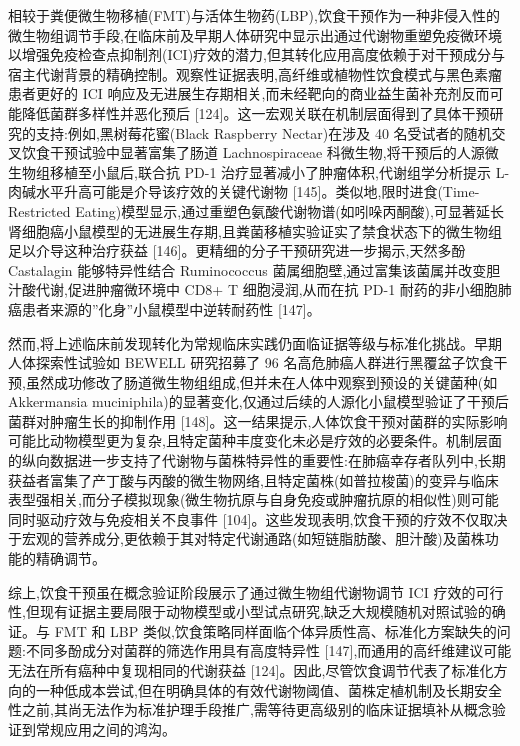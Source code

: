 \documentclass[11pt]{article}
\begin{document}
相较于粪便微生物移植(FMT)与活体生物药(LBP),饮食干预作为一种非侵入性的微生物组调节手段,在临床前及早期人体研究中显示出通过代谢物重塑免疫微环境以增强免疫检查点抑制剂(ICI)疗效的潜力,但其转化应用高度依赖于对干预成分与宿主代谢背景的精确控制。观察性证据表明,高纤维或植物性饮食模式与黑色素瘤患者更好的 ICI 响应及无进展生存期相关,而未经靶向的商业益生菌补充剂反而可能降低菌群多样性并恶化预后 {[}124{]}。这一宏观关联在机制层面得到了具体干预研究的支持:例如,黑树莓花蜜(Black Raspberry Nectar)在涉及 40 名受试者的随机交叉饮食干预试验中显著富集了肠道 Lachnospiraceae 科微生物,将干预后的人源微生物组移植至小鼠后,联合抗 PD-1 治疗显著减小了肿瘤体积,代谢组学分析提示 L-肉碱水平升高可能是介导该疗效的关键代谢物 {[}145{]}。类似地,限时进食(Time-Restricted Eating)模型显示,通过重塑色氨酸代谢物谱(如吲哚丙酮酸),可显著延长肾细胞癌小鼠模型的无进展生存期,且粪菌移植实验证实了禁食状态下的微生物组足以介导这种治疗获益 {[}146{]}。更精细的分子干预研究进一步揭示,天然多酚 Castalagin 能够特异性结合 Ruminococcus 菌属细胞壁,通过富集该菌属并改变胆汁酸代谢,促进肿瘤微环境中 CD8+ T 细胞浸润,从而在抗 PD-1 耐药的非小细胞肺癌患者来源的''化身''小鼠模型中逆转耐药性 {[}147{]}。

然而,将上述临床前发现转化为常规临床实践仍面临证据等级与标准化挑战。早期人体探索性试验如 BEWELL 研究招募了 96 名高危肺癌人群进行黑覆盆子饮食干预,虽然成功修改了肠道微生物组组成,但并未在人体中观察到预设的关键菌种(如 Akkermansia muciniphila)的显著变化,仅通过后续的人源化小鼠模型验证了干预后菌群对肿瘤生长的抑制作用 {[}148{]}。这一结果提示,人体饮食干预对菌群的实际影响可能比动物模型更为复杂,且特定菌种丰度变化未必是疗效的必要条件。机制层面的纵向数据进一步支持了代谢物与菌株特异性的重要性:在肺癌幸存者队列中,长期获益者富集了产丁酸与丙酸的微生物网络,且特定菌株(如普拉梭菌)的变异与临床表型强相关,而分子模拟现象(微生物抗原与自身免疫或肿瘤抗原的相似性)则可能同时驱动疗效与免疫相关不良事件 {[}104{]}。这些发现表明,饮食干预的疗效不仅取决于宏观的营养成分,更依赖于其对特定代谢通路(如短链脂肪酸、胆汁酸)及菌株功能的精确调节。

综上,饮食干预虽在概念验证阶段展示了通过微生物组代谢物调节 ICI 疗效的可行性,但现有证据主要局限于动物模型或小型试点研究,缺乏大规模随机对照试验的确证。与 FMT 和 LBP 类似,饮食策略同样面临个体异质性高、标准化方案缺失的问题:不同多酚成分对菌群的筛选作用具有高度特异性 {[}147{]},而通用的高纤维建议可能无法在所有癌种中复现相同的代谢获益 {[}124{]}。因此,尽管饮食调节代表了标准化方向的一种低成本尝试,但在明确具体的有效代谢物阈值、菌株定植机制及长期安全性之前,其尚无法作为标准护理手段推广,需等待更高级别的临床证据填补从概念验证到常规应用之间的鸿沟。
\end{document}
